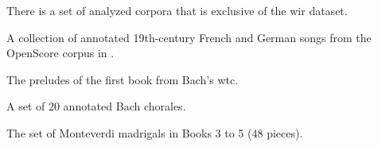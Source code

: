 

There is a set of analyzed corpora that is exclusive of the
\gls{wir} dataset.


A collection of annotated 19th-century French and German
songs from the OpenScore corpus in
\textcite{gotham2022openscore}.


The preludes of the first book from Bach's \gls{wtc}. 


A set of 20 annotated Bach chorales. 


The set of Monteverdi madrigals in Books 3 to 5 (48 pieces).

